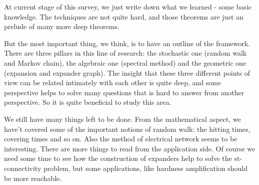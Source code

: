 At current stage of this survey, we just write down what we learned
- some basic knowledge. The techniques are not quite hard, and those
theorems are just an prelude of many more deep theorems.

But the most important thing, we think, is to have an outline of the
framework. There are three pillars in this line of research: the
stochastic one (random walk and Markov chain), the algebraic one
(spectral method) and the geometric one (expansion and expander
graph). The insight that these three different points of view can be
related intimately with each other is quite deep, and some
perspective helps to solve many questions that is hard to answer
from another perspective. So it is quite beneficial to study this
area.

We still have many things left to be done. From the mathematical
aspect, we have't covered some of the important notions of random
walk: the hitting times, covering times and so on. Also the method
of electrical network seems to be interesting. There are more things
to read from the application side. Of course we need some time to
see how the construction of expanders help to solve the
st-connectivity problem, but some applications, like hardness
amplification should be more reachable. 
